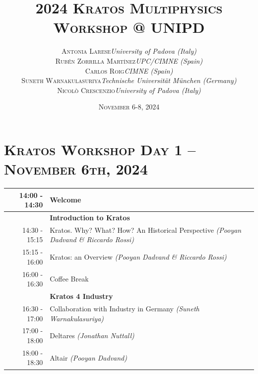 \documentclass{article}
\begin{document}
\title{
   \Huge
   2024 \textsc{Kratos Multiphysics\\Workshop @ UNIPD}
}
\author{
   \small
   \begin{tabular}{rl}
      \textsc{Antonia Larese} & \textit{University of Padova (Italy)} \\
      \textsc{Rubén Zorrilla Martínez} & \textit{UPC/CIMNE (Spain)} \\
      \textsc{Carlos Roig} & \textit{CIMNE (Spain)} \\
      \textsc{Suneth Warnakulasuriya} & \textit{Technische Universität München (Germany)} \\
      \textsc{Nicol\`o Crescenzio} & \textit{University of Padova (Italy)}
   \end{tabular}
}
\date{\textsc{November} 6-8, 2024}
\maketitle

\renewcommand{\arraystretch}{1.5}

\section*{\centering\textsc{Kratos Workshop Day 1 -- November 6th, 2024}}

\begin{table}[h]\centering
   \begin{tabularx}{0.85\textwidth}{r|X}
      \toprule%
      14:00 - 14:30 & Welcome \\%
      \midrule%
                    & {\large \textbf{Introduction to Kratos}} \\%
      14:30 - 15:15 & Kratos. Why? What? How? An Historical Perspective \textit{(Pooyan Dadvand \& Riccardo Rossi)}\\%
      15:15 - 16:00 & Kratos: an Overview \textit{(Pooyan Dadvand \& Riccardo Rossi)}\\%
      \midrule%
      \rowcolor{SeaGreen3!5!} 16:00 - 16:30 & Coffee Break \\%
      \midrule%
                    & {\large \textbf{Kratos 4 Industry}} \\%
      16:30 - 17:00 & Collaboration with Industry in Germany \textit{(Suneth Warnakulasuriya)}\\%
      17:00 - 18:00 & Deltares \textit{(Jonathan Nuttall)}\\%
      18:00 - 18:30 & Altair \textit{(Pooyan Dadvand)}\\%
      \bottomrule
   \end{tabularx}
\end{table}
\end{document}

